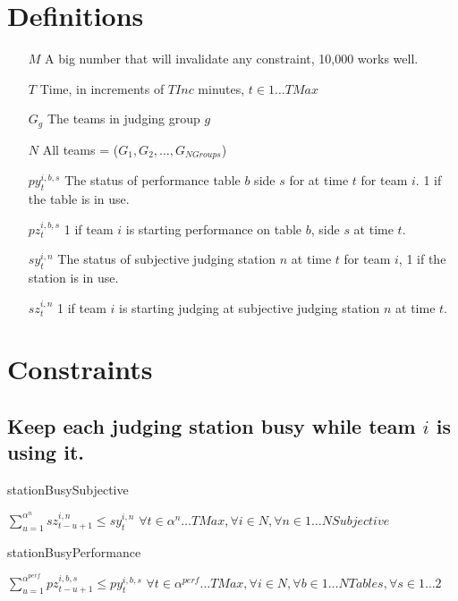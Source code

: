 \documentclass[letterpaper,11pt]{report}
\begin{document}
\section{Definitions}
\begin{itemize}

\item[$M$] A big number that will invalidate any constraint, 10,000 works well.

\item[$T$] Time, in increments of $TInc$ minutes, $t \in 1 \dots TMax$

\item[$G_{g}$] The teams in judging group $g$
\item[$N$] All teams = ($G_{1}, G_{2}, \dots, G_{NGroups}$)

\item[$py_{t}^{i,b,s}$] The status of performance table $b$ side $s$ for
at  time $t$ for team $i$. 1 if the table is in use.  

\item[$pz_{t}^{i,b,s}$] 1 if team $i$ is starting performance on table $b$,
  side $s$ at time $t$.

\item[$sy_{t}^{i,n}$] The status of subjective judging station $n$ at time $t$ for team
  $i$, 1 if the station is in use.

\item[$sz_{t}^{i,n}$] 1 if team $i$ is starting judging at subjective
judging station $n$ at time $t$.


\end{itemize}


\section{Constraints}

\subsection{Keep each judging station busy while team $i$ is using it.}

\begin{algorithm}
\caption{stationBusySubjective}
$\sum\limits_{u=1}^{\alpha^{n}} sz_{t-u+1}^{i,n} \le sy_{t}^{i,n}$
\hfill $\forall t \in \alpha^{n} \dots TMax,
\forall i \in N,
\forall n \in 1 \dots NSubjective$
\end{algorithm}

\begin{algorithm}
\caption{stationBusyPerformance}
$\sum\limits_{u=1}^{\alpha^{perf}} pz_{t-u+1}^{i,b,s} \le py_{t}^{i,b,s}$
\hfill $\forall t \in \alpha^{perf} \dots TMax, 
\forall i \in N, \forall b \in 1 \dots NTables,
\forall s \in 1 \dots 2$
\end{algorithm}
\end{document}
